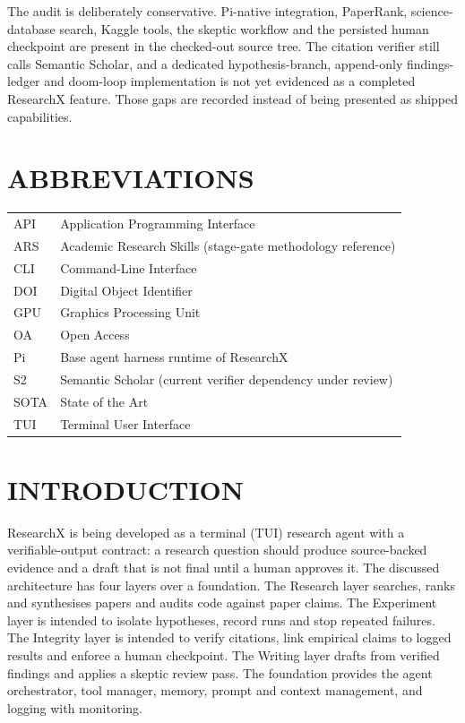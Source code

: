 \documentclass[12pt,a4paper]{report}
\numberwithin{equation}{chapter}
\begin{document}
The audit is deliberately conservative. Pi-native integration, PaperRank,
science-database search, Kaggle tools, the skeptic workflow and the persisted
human checkpoint are present in the checked-out source tree. The citation
verifier still calls Semantic Scholar, and a dedicated hypothesis-branch,
append-only findings-ledger and doom-loop implementation is not yet evidenced
as a completed ResearchX feature. Those gaps are recorded instead of being
presented as shipped capabilities.

\tableofcontents
{}
\listoffigures
{}
\listoftables
{}

\chapter*{ABBREVIATIONS}
\begin{tabular}{@{}ll@{}}
API & Application Programming Interface \\
ARS & Academic Research Skills (stage-gate methodology reference) \\
CLI & Command-Line Interface \\
DOI & Digital Object Identifier \\
GPU & Graphics Processing Unit \\
OA  & Open Access \\
Pi  & Base agent harness runtime of ResearchX \\
S2  & Semantic Scholar (current verifier dependency under review) \\
SOTA & State of the Art \\
TUI & Terminal User Interface \\
\end{tabular}
\clearpage
{}

\chapter{INTRODUCTION}

ResearchX is being developed as a terminal (TUI) research agent with a
verifiable-output contract: a research question should produce source-backed
evidence and a draft that is not final until a human approves it. The discussed
architecture has four layers over a foundation. The Research layer searches,
ranks and synthesises papers and audits code against paper claims. The
Experiment layer is intended to isolate hypotheses, record runs and stop
repeated failures. The Integrity layer is intended to verify citations, link
empirical claims to logged results and enforce a human checkpoint. The Writing
layer drafts from verified findings and applies a skeptic review pass. The
foundation provides the agent orchestrator, tool manager, memory, prompt and
context management, and logging with monitoring.
\end{document}
